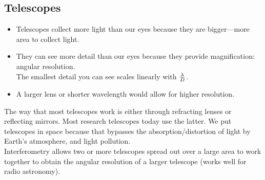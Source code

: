 \documentclass[class=article, crop=false]{standalone}
\begin{document}
  \subsection{Telescopes}
  \begin{itemize}
    \item Telescopes collect more light than our eyes because they are bigger---more area to collect light.
    \item They can see more detail than our eyes because they provide magnification: angular resolution. \\
    The smallest detail you can see scales linearly with $\frac{\lambda}{D}$.
    \item A larger lens or shorter wavelength would allow for higher resolution.
  \end{itemize}
  The way that most telescopes work is either through refracting lenses or reflecting mirrors. Most research telescopes today use the latter. We put telescopes in space because that bypasses the absorption/distortion of light by Earth's atmosphere, and light pollution. \\
  Interferometry allows two or more telescopes spread out over a large area to work together to obtain the angular resolution of a larger telescope (works well for radio astronomy).
\end{document}
